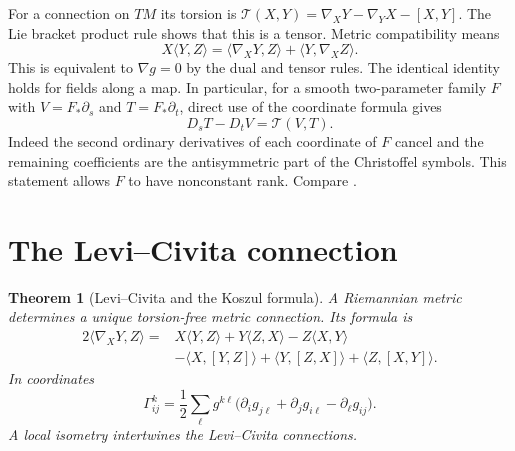 \documentclass[11pt,oneside,openany]{book}
\theoremstyle{plain}
\newtheorem{theorem}{Theorem}[chapter]
\theoremstyle{definition}
\theoremstyle{remark}
\begin{document}
For a connection on \(TM\) its torsion is
\(\mathcal T(X,Y)=\nabla_XY-\nabla_YX-[X,Y]\).
The Lie bracket product rule shows that this is a tensor.
Metric compatibility means
\[
 X\langle Y,Z\rangle
  =\langle\nabla_XY,Z\rangle+\langle Y,\nabla_XZ\rangle .
\]
This is equivalent to \(\nabla g=0\) by the dual and tensor rules.
The identical identity holds for fields along a map.
In particular, for a smooth two-parameter family \(F\) with
\(V=F_*\partial_s\) and \(T=F_*\partial_t\), direct use of the
coordinate formula gives
\[
 D_sT-D_tV=\mathcal T(V,T).
\]
Indeed the second ordinary derivatives of each coordinate of \(F\)
cancel and the remaining coefficients are the antisymmetric part
of the Christoffel symbols. This statement allows \(F\) to have
nonconstant rank. Compare \cite[Chapter 4]{LeeRM}.

\section{The Levi--Civita connection}\label{p202:G05}

\begin{theorem}[Levi--Civita and the Koszul formula]
\label{thm:p202-levi-civita}
A Riemannian metric determines a unique torsion-free metric connection.
Its formula is
\begin{align*}
 2\langle\nabla_XY,Z\rangle={}&
 X\langle Y,Z\rangle+Y\langle Z,X\rangle-Z\langle X,Y\rangle\\
 &-\langle X,[Y,Z]\rangle+\langle Y,[Z,X]\rangle
     +\langle Z,[X,Y]\rangle .
\end{align*}
In coordinates
\[
 \Gamma^k_{ij}=\frac12\sum_{\ell}g^{k\ell}
       \bigl(\partial_i g_{j\ell}+\partial_j g_{i\ell}
                          -\partial_\ell g_{ij}\bigr).
\]
A local isometry intertwines the Levi--Civita connections.
\end{theorem}
\end{document}
